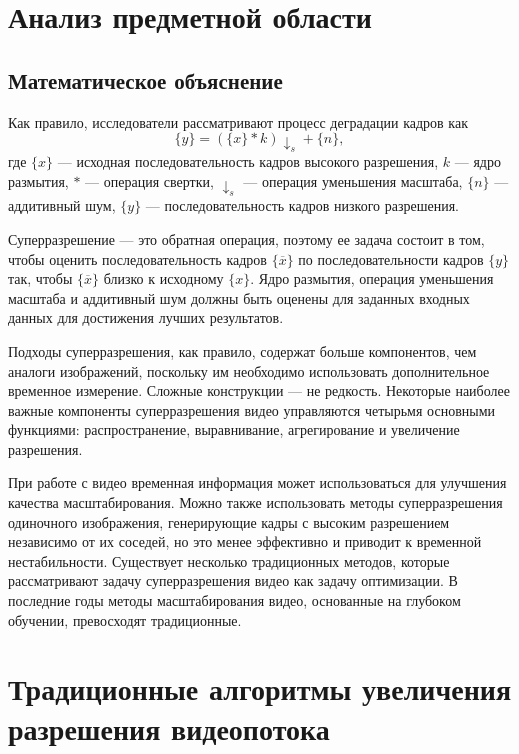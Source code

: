 \documentclass{bmstu}
\begin{document}
\chapter{Анализ предметной области}

\section{Математическое объяснение}

Как правило, исследователи рассматривают процесс деградации кадров как
\begin{equation}
\{y\} = (\{x\} * k) \downarrow _{s} + \{n\},
\end{equation}
где $\{x\}$ --- исходная последовательность кадров высокого разрешения, $k$ --- ядро размытия, $*$ --- операция свертки, $\downarrow _{s}$ --- операция уменьшения масштаба, $\{n\}$ --- аддитивный шум, $\{y\}$ --- последовательность кадров низкого разрешения.

Суперразрешение --- это обратная операция, поэтому ее задача состоит в том, чтобы оценить последовательность кадров $\{\overline{x}\}$ по последовательности кадров $\{y\}$ так, чтобы $\{\overline{x}\}$ близко к исходному $\{x\}$. 
Ядро размытия, операция уменьшения масштаба и аддитивный шум должны быть оценены для заданных входных данных для достижения лучших результатов.

Подходы суперразрешения, как правило, содержат больше компонентов, чем аналоги изображений, поскольку им необходимо использовать дополнительное временное измерение. 
Сложные конструкции --- не редкость. 
Некоторые наиболее важные компоненты суперразрешения видео управляются четырьмя основными функциями: распространение, выравнивание, агрегирование и увеличение разрешения.

При работе с видео временная информация может использоваться для улучшения качества масштабирования. 
Можно также использовать методы суперразрешения одиночного изображения, генерирующие кадры с высоким разрешением независимо от их соседей, но это менее эффективно и приводит к временной нестабильности. 
Существует несколько традиционных методов, которые рассматривают задачу суперразрешения видео как задачу оптимизации.  
В последние годы методы масштабирования видео, основанные на глубоком обучении, превосходят традиционные.

\chapter{Традиционные алгоритмы увеличения разрешения видеопотока}
\end{document}
